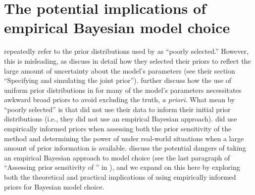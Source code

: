 \section*{The potential implications of empirical Bayesian model choice}
\citet{Hickerson2013} repeatedly refer to the prior distributions used by
\citet{Oaks2012} as ``poorly selected.''
However, this is misleading, as \citet{Oaks2012} discuss in detail how they
selected their priors to reflect the large amount of uncertainty about the
model's parameters (see their section ``Specifying and simulating the joint
prior'').
\citet{Oaks2012} further discuss how the use of uniform prior distributions in
\msb for many of the model's parameters necessitates awkward broad priors to
avoid excluding the truth, \textit{a priori}.
What \citet{Hickerson2013} mean by ``poorly selected'' is that
\citet{Oaks2012} did not use their data to inform their initial prior
distributions (i.e., they did not use an empirical Bayesian approach).
\citet{Oaks2012} did use empirically informed priors when assessing both the
prior sensitivity of the method and determining the power of \msb under
real-world situations when a large amount of prior information is available. 
\citet{Oaks2012} discuss
the potential dangers of taking an empirical Bayesian approach to model choice
(see the last paragraph of ``Assessing prior sensitivity of \msb'' in
\citet{Oaks2012}), and we expand on this here by exploring both the theoretical
and practical implications of using empirically informed priors for Bayesian
model choice.

